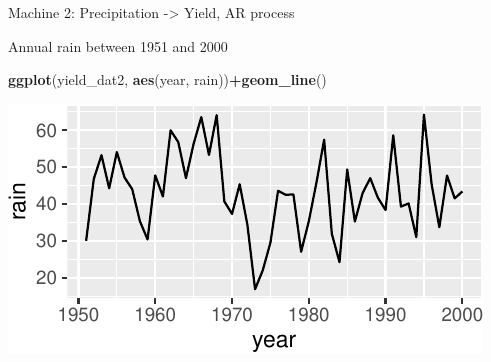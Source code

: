 \documentclass[
  12pt,
  ignorenonframetext,
  aspectratio=169,
]{beamer}
\newenvironment{Shaded}{\begin{snugshade}}{\end{snugshade}}
\newcommand{\KeywordTok}[1]{\textcolor[rgb]{0.13,0.29,0.53}{\textbf{#1}}}
\newcommand{\NormalTok}[1]{#1}
\newcommand{\OperatorTok}[1]{\textcolor[rgb]{0.81,0.36,0.00}{\textbf{#1}}}
\begin{document}
\begin{frame}[fragile]{Machine 2: Precipitation -\textgreater{} Yield,
AR process}
\protect\hypertarget{machine-2-precipitation---yield-ar-process-1}{}

\begin{block}{Annual rain between 1951 and 2000}

\begin{Shaded}
\begin{Highlighting}[]
\KeywordTok{ggplot}\NormalTok{(yield_dat2, }\KeywordTok{aes}\NormalTok{(year, rain))}\OperatorTok{+}\KeywordTok{geom_line}\NormalTok{()}
\end{Highlighting}
\end{Shaded}

\begin{center}\includegraphics{Lecture-2_files/figure-beamer/unnamed-chunk-7-1} \end{center}

\end{block}

\end{frame}
\end{document}
